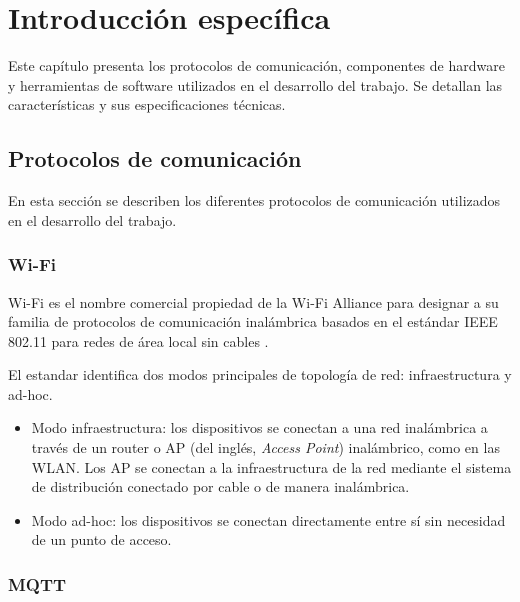 \chapter{Introducción específica}

Este capítulo presenta los protocolos de comunicación, componentes de hardware
y herramientas de software utilizados en el desarrollo del trabajo. Se detallan
las características y sus especificaciones técnicas.


\section{Protocolos de comunicación}

En esta sección se describen los diferentes protocolos de comunicación
utilizados en el desarrollo del trabajo. 

\subsection{Wi-Fi}

Wi-Fi es el nombre comercial propiedad de la Wi-Fi Alliance para designar a su
familia de protocolos de comunicación inalámbrica basados en el estándar IEEE
802.11 para redes de área local sin cables \cite{Li2019}.

El estandar identifica dos modos principales de topología de red:
infraestructura y ad-hoc.

\begin{itemize}
	\item Modo infraestructura: los dispositivos se conectan a una red inalámbrica a
	      través de un router o AP (del inglés, \textit{Access Point}) inalámbrico, como
	      en las WLAN. Los AP se conectan a la infraestructura de la red mediante el
	      sistema de distribución conectado por cable o de manera inalámbrica.
	\item Modo ad-hoc: los dispositivos se conectan directamente entre sí sin necesidad
	      de un punto de acceso.
\end{itemize}

\subsection{MQTT}

